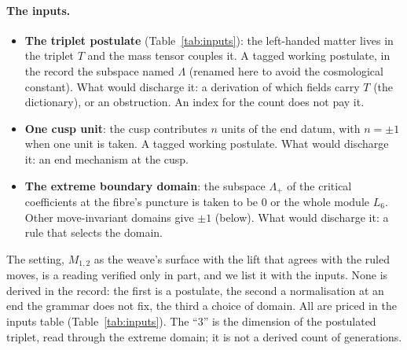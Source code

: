 \paragraph{The inputs.}
\begin{itemize}
\item \textbf{The triplet postulate} (Table~\ref{tab:inputs}): the left-handed matter lives in the triplet $T$ and the mass
  tensor couples it. A tagged working postulate, in the record the subspace named $\Lambda$ (renamed here to avoid the
  cosmological constant). What would discharge it: a derivation of which fields carry $T$ (the dictionary), or an obstruction. An index for the
  count does not pay it.
\item \textbf{One cusp unit}: the cusp contributes $n$ units of the end datum, with $n=\pm1$ when one unit is taken.
  A tagged working postulate. What would discharge it: an end mechanism at the cusp.
\item \textbf{The extreme boundary domain}: the subspace $\Lambda_+$ of the critical coefficients at the fibre's puncture is taken to be
  $0$ or the whole module $L_6$. Other move-invariant domains give $\pm1$ (below). What would discharge it: a rule that selects
  the domain.
\end{itemize}
The setting, $M_{1,2}$ as the weave's surface with the lift that agrees with the ruled moves, is a reading verified only
in part, and we list it with the inputs.
None is derived in the record: the first is a postulate, the second a normalisation at an end the grammar does not fix,
the third a choice of domain. All are priced in the inputs table (Table~\ref{tab:inputs}). The ``$3$'' is the dimension
of the postulated triplet, read through the extreme domain; it is not a derived count of generations.

